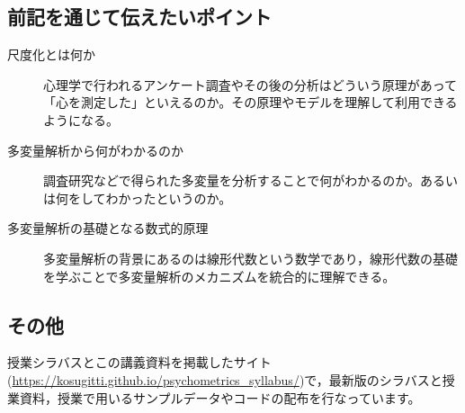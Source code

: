\subsection*{前記を通じて伝えたいポイント}
\begin{description}
	\item[尺度化とは何か] 心理学で行われるアンケート調査やその後の分析はどういう原理があって「心を測定した」といえるのか。その原理やモデルを理解して利用できるようになる。
	\item[多変量解析から何がわかるのか] 調査研究などで得られた多変量を分析することで何がわかるのか。あるいは何をしてわかったというのか。
	\item[多変量解析の基礎となる数式的原理] 多変量解析の背景にあるのは線形代数という数学であり，線形代数の基礎を学ぶことで多変量解析のメカニズムを統合的に理解できる。
\end{description}

\subsection*{その他}
授業シラバスとこの講義資料を掲載したサイト(\url{https://kosugitti.github.io/psychometrics_syllabus/})で，最新版のシラバスと授業資料，授業で用いるサンプルデータやコードの配布を行なっています。
